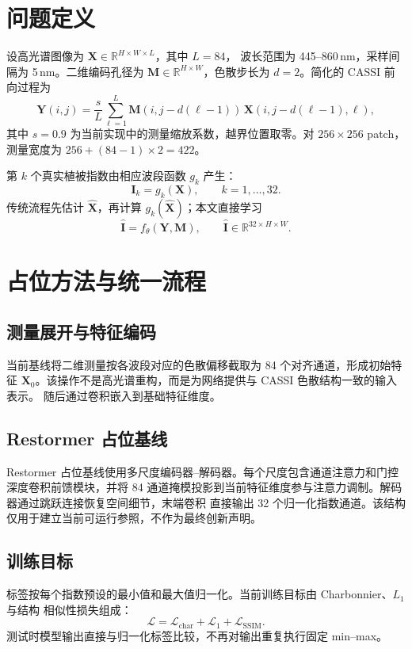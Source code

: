 \documentclass[UTF8,12pt,a4paper]{ctexart}
\newcommand{\method}{Restormer 占位基线}
\begin{document}
\section{问题定义}

设高光谱图像为 $\mathbf{X}\in\mathbb{R}^{H\times W\times L}$，其中 $L=84$，
波长范围为 445--860\,nm，采样间隔为 5\,nm。二维编码孔径为
$\mathbf{M}\in\mathbb{R}^{H\times W}$，色散步长为 $d=2$。简化的 CASSI 前向过程为
\begin{equation}
  \mathbf{Y}(i,j)=\frac{s}{L}\sum_{\ell=1}^{L}
  \mathbf{M}(i,j-d(\ell-1))\,
  \mathbf{X}(i,j-d(\ell-1),\ell),
  \label{eq:cassi}
\end{equation}
其中 $s=0.9$ 为当前实现中的测量缩放系数，越界位置取零。对 $256\times256$ patch，
测量宽度为 $256+(84-1)\times2=422$。

第 $k$ 个真实植被指数由相应波段函数 $g_k$ 产生：
\begin{equation}
  \mathbf{I}_k=g_k(\mathbf{X}),\qquad k=1,\ldots,32.
\end{equation}
传统流程先估计 $\hat{\mathbf{X}}$，再计算 $g_k(\hat{\mathbf{X}})$；本文直接学习
\begin{equation}
  \hat{\mathbf{I}}=f_{\theta}(\mathbf{Y},\mathbf{M}),
  \qquad \hat{\mathbf{I}}\in\mathbb{R}^{32\times H\times W}.
  \label{eq:direct}
\end{equation}

\section{占位方法与统一流程}

\subsection{测量展开与特征编码}
当前基线将二维测量按各波段对应的色散偏移截取为 84 个对齐通道，形成初始特征
$\mathbf{X}_0$。该操作不是高光谱重构，而是为网络提供与 CASSI 色散结构一致的输入表示。
随后通过卷积嵌入到基础特征维度。

\subsection{Restormer 占位基线}
\method 使用多尺度编码器--解码器。每个尺度包含通道注意力和门控深度卷积前馈模块，并将
84 通道掩模投影到当前特征维度参与注意力调制。解码器通过跳跃连接恢复空间细节，末端卷积
直接输出 32 个归一化指数通道。该结构仅用于建立当前可运行参照，不作为最终创新声明。

\subsection{训练目标}
标签按每个指数预设的最小值和最大值归一化。当前训练目标由 Charbonnier、$L_1$ 与结构
相似性损失组成：
\begin{equation}
  \mathcal{L}=\mathcal{L}_{\mathrm{char}}+
  \mathcal{L}_{1}+\mathcal{L}_{\mathrm{SSIM}}.
\end{equation}
测试时模型输出直接与归一化标签比较，不再对输出重复执行固定 min--max。
\end{document}
